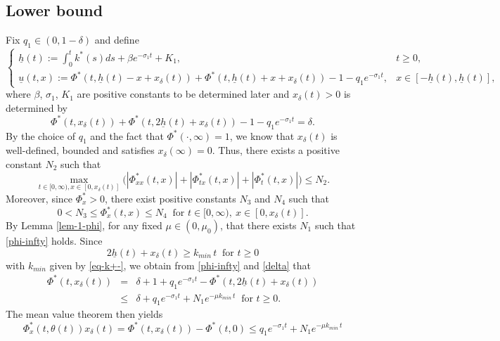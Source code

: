 \documentclass[11pt]{amsart}
\numberwithin{equation}{section}
\begin{document}
 \subsection{Lower bound}
 Fix $q_1\in(0,1-\delta)$ and define
 \begin{equation}\label{eq-low}
  \begin{cases}
  \displaystyle\underline{h}(t):=\int_0^{t}k^*(s)ds+\beta e^{-\sigma_1t}+K_1,  &t\geq0,\\
  \underline{u}(t,x):=\Phi^*(t,\underline{h}(t)-x+x_\delta(t))+\Phi^*(t,\underline{h}(t)+x+x_\delta(t))-1-q_1e^{-\sigma_1t}, &x\in[-\underline{h}(t),\underline{h}(t)],
 \end{cases}
 \end{equation}
where  $\beta$, $\sigma_1$, $K_1$ are  positive constants to be determined later and $x_\delta(t)>0$ is determined by  
\begin{equation}\label{delta}
\Phi^*(t,x_\delta(t))+\Phi^*(t,2\underline{h}(t)+x_\delta(t))-1-q_1e^{-\sigma_1t}=\delta.
 \end{equation}
By the choice of $q_1$ and the fact that $\Phi^*(\cdot,\infty)=1$, we  know that   $x_\delta(t)$ is well-defined, bounded and  satisfies $x_\delta(\infty)=0$. Thus, there exists a positive constant $N_2$ such that 
\begin{equation}\label{phiz-bound}
  \max\limits_{t\in[0,\infty),x\in[0,x_\delta(t)]}\Big(|\Phi_{xx}^*(t,x)|+|\Phi^*_{tx}(t,x)|+|\Phi^*_{t}(t,x)|\Big)\leq N_2.
\end{equation}
Moreover, since $\Phi^*_x>0$, there exist positive constants $N_3$ and $N_4$  such that 
\begin{equation}\label{phiz-bound+}
  0<N_3\leq \Phi_{x}^*(t,x)\leq N_4 ~\text{ for }t\in[0,\infty),\ x\in[0,x_\delta(t)].
\end{equation}
By Lemma \ref{lem-1-phi}, for any fixed $\mu\in(0,\mu_0)$,  that there exists $N_1$ such that    \eqref{phi-infty} holds.
Since
\[2\underline{h}(t)+x_\delta(t)\geq  k_{min}\,t ~\text{ for }t\geq 0\]
with $k_{min}$ given by \eqref{eq-k+-}, we obtain from \eqref{phi-infty} and  \eqref{delta} that 
\begin{eqnarray*}
  \Phi^*(t,x_\delta(t))&=&\delta+1+q_1e^{-\sigma_1t}-\Phi^*(t,2\underline{h}(t)+x_\delta(t))\\
  &\leq& \delta+q_1e^{-\sigma_1t}+N_1 e^{-\mu  k_{min}\,t}\ \mbox{ for }t\geq0.
\end{eqnarray*}
The  mean value theorem then yields
\begin{equation*}
  \Phi_x^*(t,\theta(t))x_\delta(t)=\Phi^*(t,x_\delta(t))-\Phi^*(t,0)\leq  q_1e^{-\sigma_1t}+N_1 e^{-\mu  k_{min}\,t}
\end{equation*}
\end{document}
